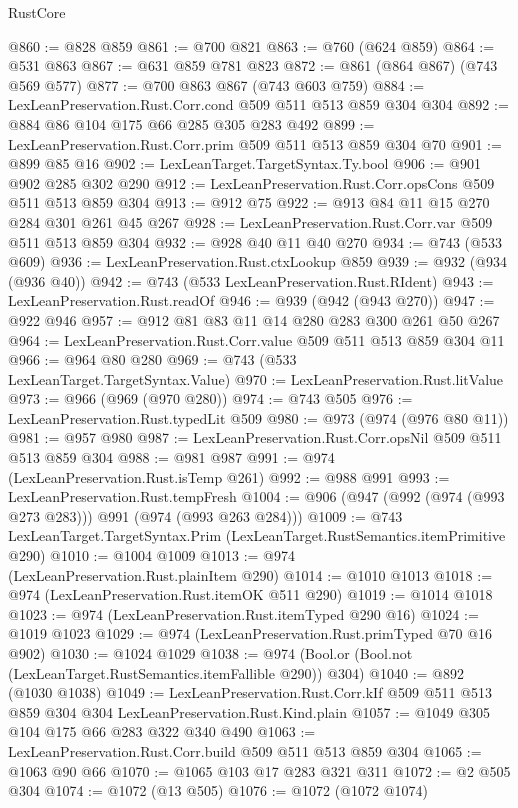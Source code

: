 \begin{lexlean}{RustCore}
\begin{coremodule}
@860 := @828 @859
@861 := @700 @821
@863 := @760 (@624 @859)
@864 := @531 @863
@867 := @631 @859 @781 @823
@872 := @861 (@864 @867) (@743 @569 @577)
@877 := @700 @863 @867 (@743 @603 @759)
@884 := LexLeanPreservation.Rust.Corr.cond @509 @511 @513 @859 @304 @304
@892 := @884 @86 @104 @175 @66 @285 @305 @283 @492
@899 := LexLeanPreservation.Rust.Corr.prim @509 @511 @513 @859 @304 @70
@901 := @899 @85 @16
@902 := LexLeanTarget.TargetSyntax.Ty.bool
@906 := @901 @902 @285 @302 @290
@912 := LexLeanPreservation.Rust.Corr.opsCons @509 @511 @513 @859 @304
@913 := @912 @75
@922 := @913 @84 @11 @15 @270 @284 @301 @261 @45 @267
@928 := LexLeanPreservation.Rust.Corr.var @509 @511 @513 @859 @304
@932 := @928 @40 @11 @40 @270
@934 := @743 (@533 @609)
@936 := LexLeanPreservation.Rust.ctxLookup @859
@939 := @932 (@934 (@936 @40))
@942 := @743 (@533 LexLeanPreservation.Rust.RIdent)
@943 := LexLeanPreservation.Rust.readOf
@946 := @939 (@942 (@943 @270))
@947 := @922 @946
@957 := @912 @81 @83 @11 @14 @280 @283 @300 @261 @50 @267
@964 := LexLeanPreservation.Rust.Corr.value @509 @511 @513 @859 @304 @11
@966 := @964 @80 @280
@969 := @743 (@533 LexLeanTarget.TargetSyntax.Value)
@970 := LexLeanPreservation.Rust.litValue
@973 := @966 (@969 (@970 @280))
@974 := @743 @505
@976 := LexLeanPreservation.Rust.typedLit @509
@980 := @973 (@974 (@976 @80 @11))
@981 := @957 @980
@987 := LexLeanPreservation.Rust.Corr.opsNil @509 @511 @513 @859 @304
@988 := @981 @987
@991 := @974 (LexLeanPreservation.Rust.isTemp @261)
@992 := @988 @991
@993 := LexLeanPreservation.Rust.tempFresh
@1004 := @906 (@947 (@992 (@974 (@993 @273 @283))) @991 (@974 (@993 @263 @284)))
@1009 := @743 LexLeanTarget.TargetSyntax.Prim (LexLeanTarget.RustSemantics.itemPrimitive @290)
@1010 := @1004 @1009
@1013 := @974 (LexLeanPreservation.Rust.plainItem @290)
@1014 := @1010 @1013
@1018 := @974 (LexLeanPreservation.Rust.itemOK @511 @290)
@1019 := @1014 @1018
@1023 := @974 (LexLeanPreservation.Rust.itemTyped @290 @16)
@1024 := @1019 @1023
@1029 := @974 (LexLeanPreservation.Rust.primTyped @70 @16 @902)
@1030 := @1024 @1029
@1038 := @974 (Bool.or (Bool.not (LexLeanTarget.RustSemantics.itemFallible @290)) @304)
@1040 := @892 (@1030 @1038)
@1049 := LexLeanPreservation.Rust.Corr.kIf
    @509
    @511
    @513
    @859
    @304
    @304
    LexLeanPreservation.Rust.Kind.plain
@1057 := @1049 @305 @104 @175 @66 @283 @322 @340 @490
@1063 := LexLeanPreservation.Rust.Corr.build @509 @511 @513 @859 @304
@1065 := @1063 @90 @66
@1070 := @1065 @103 @17 @283 @321 @311
@1072 := @2 @505 @304
@1074 := @1072 (@13 @505)
@1076 := @1072 (@1072 @1074)

\end{coremodule}
\end{lexlean}

